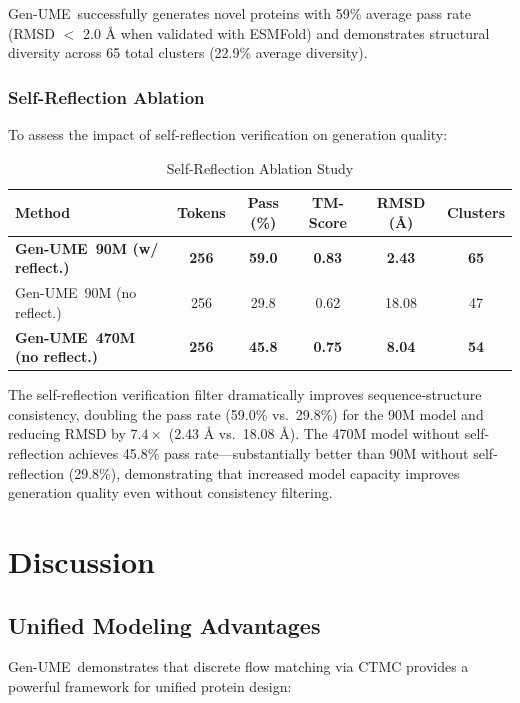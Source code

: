 \documentclass[11pt,a4paper]{article}
\newcommand{\genume}{Gen-UME}
\begin{document}
\genume~successfully generates novel proteins with 59\% average pass rate (RMSD $<$ 2.0 Å when validated with ESMFold) and demonstrates structural diversity across 65 total clusters (22.9\% average diversity).

\subsubsection{Self-Reflection Ablation}

To assess the impact of self-reflection verification on generation quality:

\begin{table}[h]
\centering
\caption{Self-Reflection Ablation Study}
\begin{tabular}{@{}lccccc@{}}
\toprule
\textbf{Method} & \textbf{Tokens} & \textbf{Pass (\%)} & \textbf{TM-Score} & \textbf{RMSD (Å)} & \textbf{Clusters} \\
\midrule
\textbf{\genume~90M (w/ reflect.)} & \textbf{256} & \textbf{59.0} & \textbf{0.83} & \textbf{2.43} & \textbf{65} \\
\genume~90M (no reflect.) & 256 & 29.8 & 0.62 & 18.08 & 47 \\
\textbf{\genume~470M (no reflect.)} & \textbf{256} & \textbf{45.8} & \textbf{0.75} & \textbf{8.04} & \textbf{54} \\
\bottomrule
\end{tabular}
\label{tab:self_reflection}
\end{table}

The self-reflection verification filter dramatically improves sequence-structure consistency, doubling the pass rate (59.0\% vs.~29.8\%) for the 90M model and reducing RMSD by $7.4\times$ (2.43 Å vs.~18.08 Å). The 470M model without self-reflection achieves 45.8\% pass rate---substantially better than 90M without self-reflection (29.8\%), demonstrating that increased model capacity improves generation quality even without consistency filtering.

\section{Discussion}

\subsection{Unified Modeling Advantages}

\genume~demonstrates that discrete flow matching via CTMC \cite{campbell2024} provides a powerful framework for unified protein design:
\end{document}
